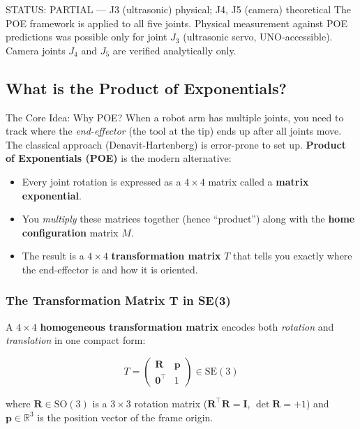 \documentclass[12pt,a4paper]{article}
\newcommand{\R}{\mathbb{R}}
\newcommand{\SO}{\mathrm{SO}(3)}
\newcommand{\SE}{\mathrm{SE}(3)}
\newcommand{\vect}[1]{\bm{#1}}
\newcommand{\mat}[1]{\mathbf{#1}}
\begin{document}
\begin{warnbox}{STATUS: PARTIAL --- J3 (ultrasonic) physical; J4, J5 (camera) theoretical}
The POE framework is applied to all five joints. Physical measurement against
POE predictions was possible only for joint $J_3$ (ultrasonic servo, UNO-accessible).
Camera joints $J_4$ and $J_5$ are verified analytically only.
\end{warnbox}

\subsection{What is the Product of Exponentials?}

\begin{conceptbox}{The Core Idea: Why POE?}
When a robot arm has multiple joints, you need to track where the
\emph{end-effector} (the tool at the tip) ends up after all joints move.
The classical approach (Denavit-Hartenberg) is error-prone to set up.
\textbf{Product of Exponentials (POE)} is the modern alternative:

\begin{itemize}[leftmargin=1.5em]
  \item Every joint rotation is expressed as a $4\times4$ matrix called a
        \textbf{matrix exponential}.
  \item You \emph{multiply} these matrices together (hence ``product'') along
        with the \textbf{home configuration} matrix $M$.
  \item The result is a $4\times4$ \textbf{transformation matrix} $T$ that
        tells you exactly where the end-effector is and how it is oriented.
\end{itemize}
\end{conceptbox}

\subsubsection{The Transformation Matrix T in SE(3)}

A $4 \times 4$ \textbf{homogeneous transformation matrix} encodes both
\emph{rotation} and \emph{translation} in one compact form:

\[
  T = \begin{pmatrix} \mat{R} & \vect{p} \\ \vect{0}^\top & 1 \end{pmatrix}
  \in \SE
\]

where $\mat{R} \in \SO$ is a $3\times3$ rotation matrix ($\mat{R}^\top\mat{R}=\mat{I}$,
$\det\mat{R}=+1$) and $\vect{p}\in\R^3$ is the position vector of the frame
origin.
\end{document}
